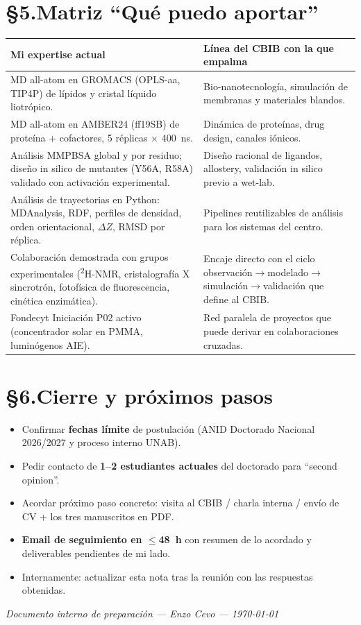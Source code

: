 \documentclass[11pt,a4paper]{article}
\begin{document}
\section*{\S5.\quad Matriz ``Qué puedo aportar''}

\renewcommand{\arraystretch}{1.25}
\begin{tabularx}{\textwidth}{@{}p{}X@{}}
\toprule
\textbf{Mi expertise actual} & \textbf{Línea del CBIB con la que empalma} \\
\midrule
MD all-atom en GROMACS (OPLS-aa, TIP4P) de lípidos y cristal líquido liotrópico. & Bio-nanotecnología, simulación de membranas y materiales blandos. \\
MD all-atom en AMBER24 (ff19SB) de proteína + cofactores, 5 réplicas $\times$ 400~ns. & Dinámica de proteínas, drug design, canales iónicos. \\
Análisis MMPBSA global y por residuo; diseño in silico de mutantes (Y56A, R58A) validado con activación experimental. & Diseño racional de ligandos, allostery, validación in silico previo a wet-lab. \\
Análisis de trayectorias en Python: MDAnalysis, RDF, perfiles de densidad, orden orientacional, $\Delta Z$, RMSD por réplica. & Pipelines reutilizables de análisis para los sistemas del centro. \\
Colaboración demostrada con grupos experimentales (\textsuperscript{2}H-NMR, cristalografía X sincrotrón, fotofísica de fluorescencia, cinética enzimática). & Encaje directo con el ciclo observación$\rightarrow$modelado$\rightarrow$simulación$\rightarrow$validación que define al CBIB. \\
Fondecyt Iniciación P02 activo (concentrador solar en PMMA, luminógenos AIE). & Red paralela de proyectos que puede derivar en colaboraciones cruzadas. \\
\bottomrule
\end{tabularx}

\section*{\S6.\quad Cierre y próximos pasos}

\begin{itemize}
    \item[$\square$] Confirmar \textbf{fechas límite} de postulación (ANID Doctorado Nacional 2026/2027 y proceso interno UNAB).
    \item[$\square$] Pedir contacto de \textbf{1--2 estudiantes actuales} del doctorado para ``second opinion''.
    \item[$\square$] Acordar próximo paso concreto: visita al CBIB / charla interna / envío de CV + los tres manuscritos en PDF.
    \item[$\square$] \textbf{Email de seguimiento en $\leq$48~h} con resumen de lo acordado y deliverables pendientes de mi lado.
    \item[$\square$] Internamente: actualizar esta nota tras la reunión con las respuestas obtenidas.
\end{itemize}

\vfill
\begin{center}
    \small\textit{Documento interno de preparación --- Enzo Cevo --- \today}
\end{center}
\end{document}
